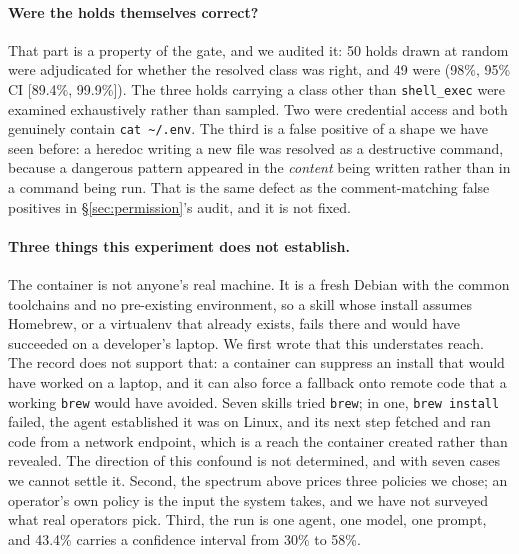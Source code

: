 \documentclass[10pt]{article}
\begin{document}
\paragraph{Were the holds themselves correct?} That part is a property of the gate,
and we audited it: 50 holds drawn at random were adjudicated for whether the resolved
class was right, and 49 were (98\%, 95\% CI [89.4\%, 99.9\%]). The three holds
carrying a class other than \texttt{shell\_exec} were examined exhaustively rather
than sampled. Two were credential access and both genuinely contain
\texttt{cat \textasciitilde{}/.env}. The third is a false positive of a shape we have
seen before: a heredoc writing a new file was resolved as a destructive command,
because a dangerous pattern appeared in the \emph{content} being written rather than
in a command being run. That is the same defect as the comment-matching false
positives in \S\ref{sec:permission}'s audit, and it is not fixed.

\paragraph{Three things this experiment does not establish.} The container is not
anyone's real machine. It is a fresh Debian with the common toolchains and no
pre-existing environment, so a skill whose install assumes Homebrew, or a virtualenv
that already exists, fails there and would have succeeded on a developer's laptop.
We first wrote that this understates reach. The record does not support that: a
container can suppress an install that would have worked on a laptop, and it can also
force a fallback onto remote code that a working \texttt{brew} would have avoided.
Seven skills tried \texttt{brew}; in one, \texttt{brew install} failed, the agent
established it was on Linux, and its next step fetched and ran code from a network
endpoint, which is a reach the container created rather than revealed. The direction
of this confound is not determined, and with seven cases we cannot settle it.
Second, the spectrum above prices three policies we chose; an operator's own policy
is the input the system takes, and we have not surveyed what real operators pick. Third, the run is one agent, one
model, one prompt, and 43.4\% carries a confidence interval from 30\% to 58\%.
\end{document}

